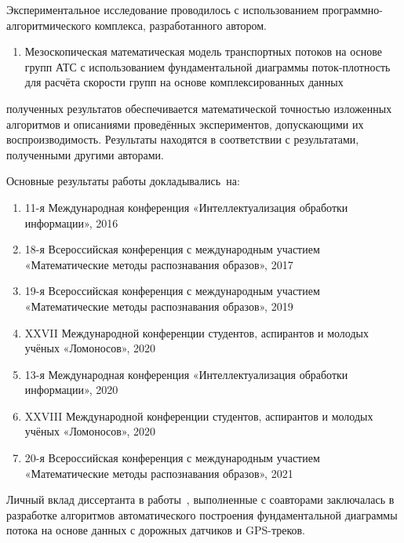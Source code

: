 {\methods} Экспериментальное исследование проводилось с использованием программно-алгоритмического комплекса, разработанного автором.

{}
\begin{enumerate}[beginpenalty=10000] %
  \item Мезоскопическая математическая модель транспортных потоков на основе групп АТС с использованием фундаментальной диаграммы поток-плотность для расчёта скорости групп на основе комплексированных данных
\end{enumerate}


{\reliability} полученных результатов обеспечивается математической точностью изложенных алгоритмов и описаниями проведённых экспериментов, допускающими их воспроизводимость.
Результаты находятся в соответствии с результатами, полученными другими авторами.


{\probation}
Основные результаты работы докладывались~на:
\begin{enumerate}
  \item 11-я Международная конференция «Интеллектуализация обработки информации», 2016
  \item 18-я Всероссийская конференция с международным участием «Математические методы распознавания образов», 2017
  \item 19-я Всероссийская конференция с международным участием «Математические методы распознавания образов», 2019
  \item XXVII Международной конференции студентов, аспирантов и молодых учёных «Ломоносов», 2020
  \item 13-я Международная конференция «Интеллектуализация обработки информации», 2020
  \item XXVIII Международной конференции студентов, аспирантов и молодых учёных «Ломоносов», 2020
  \item 20-я Всероссийская конференция с международным участием «Математические методы распознавания образов», 2021
\end{enumerate}

{\contribution} Личный вклад диссертанта в работы~\autocite{collectiveArticle2, collectiveArticle}, выполненные с соавторами заключалась в разработке алгоритмов автоматического построения фундаментальной диаграммы потока на основе данных с дорожных датчиков и GPS-треков.

